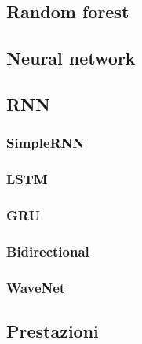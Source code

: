 \subsection{Random forest}

\subsection{Neural network}

\subsection{RNN}
\subsubsection{SimpleRNN}
\subsubsection{LSTM}
\subsubsection{GRU}
\subsubsection{Bidirectional}
\subsubsection{WaveNet}

\subsection{Prestazioni}